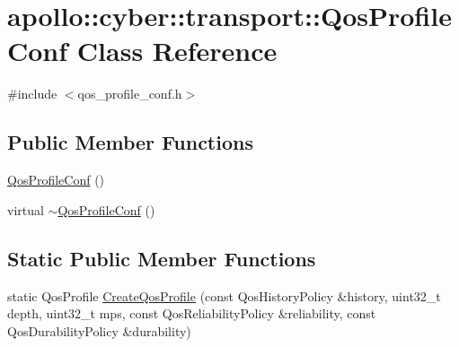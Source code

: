 \hypertarget{classapollo_1_1cyber_1_1transport_1_1QosProfileConf}{\section{apollo\-:\-:cyber\-:\-:transport\-:\-:Qos\-Profile\-Conf Class Reference}
\label{classapollo_1_1cyber_1_1transport_1_1QosProfileConf}
}


{\ttfamily \#include $<$qos\-\_\-profile\-\_\-conf.\-h$>$}

\subsection*{Public Member Functions}
\begin{DoxyCompactItemize}
\item 
\hyperlink{classapollo_1_1cyber_1_1transport_1_1QosProfileConf_af5a88db72d2ab1ede89f1b4c33510aed}{Qos\-Profile\-Conf} ()
\item 
virtual \hyperlink{classapollo_1_1cyber_1_1transport_1_1QosProfileConf_ad5e767f378c097c27b71ac380d069ac9}{$\sim$\-Qos\-Profile\-Conf} ()
\end{DoxyCompactItemize}
\subsection*{Static Public Member Functions}
\begin{DoxyCompactItemize}
\item 
static Qos\-Profile \hyperlink{classapollo_1_1cyber_1_1transport_1_1QosProfileConf_acc1fcf4121185d2ad0a98b6e4e9f8e15}{Create\-Qos\-Profile} (const Qos\-History\-Policy \&history, uint32\-\_\-t depth, uint32\-\_\-t mps, const Qos\-Reliability\-Policy \&reliability, const Qos\-Durability\-Policy \&durability)
\end{DoxyCompactItemize}
